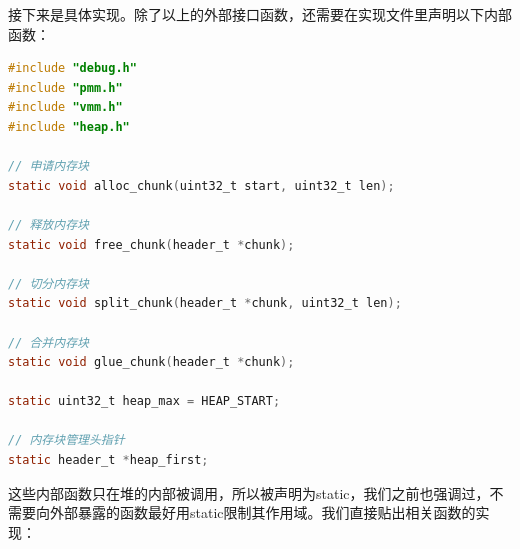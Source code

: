 \par 接下来是具体实现。除了以上的外部接口函数，还需要在实现文件里声明以下内部函数：

\begin{lstlisting}[language = C, caption = mm/heap.c]
#include "debug.h"
#include "pmm.h"
#include "vmm.h"
#include "heap.h"

// 申请内存块
static void alloc_chunk(uint32_t start, uint32_t len);

// 释放内存块
static void free_chunk(header_t *chunk);

// 切分内存块
static void split_chunk(header_t *chunk, uint32_t len);

// 合并内存块
static void glue_chunk(header_t *chunk);

static uint32_t heap_max = HEAP_START;

// 内存块管理头指针
static header_t *heap_first;
\end{lstlisting}

\par 这些内部函数只在堆的内部被调用，所以被声明为static，我们之前也强调过，不需要向外部暴露的函数最好用static限制其作用域。我们直接贴出相关函数的实现：

